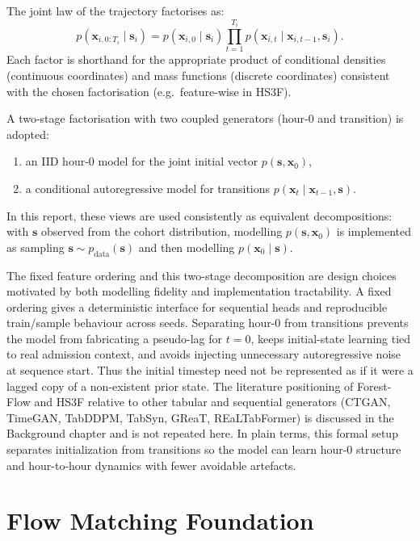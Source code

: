 The joint law of the trajectory factorises as:
\begin{equation}
p(\mathbf{x}_{i,0:T_i} \mid \mathbf{s}_i)
= p(\mathbf{x}_{i,0} \mid \mathbf{s}_i)\prod_{t=1}^{T_i}p(\mathbf{x}_{i,t}\mid \mathbf{x}_{i,t-1}, \mathbf{s}_i).
\end{equation}
Each factor is shorthand for the appropriate product of conditional densities (continuous coordinates) and mass functions (discrete coordinates) consistent with the chosen factorisation (e.g.\ feature-wise in HS3F).

A two-stage factorisation with two coupled generators (hour-0 and transition) is adopted:
\begin{enumerate}\tightlist
    \item an IID hour-0 model for the joint initial vector $p(\mathbf{s},\mathbf{x}_{0})$,
    \item a conditional autoregressive model for transitions $p(\mathbf{x}_{t}\mid\mathbf{x}_{t-1},\mathbf{s})$.
\end{enumerate}
In this report, these views are used consistently as equivalent decompositions: with $\mathbf{s}$ observed from the cohort distribution, modelling $p(\mathbf{s},\mathbf{x}_0)$ is implemented as sampling $\mathbf{s}\sim p_{\text{data}}(\mathbf{s})$ and then modelling $p(\mathbf{x}_0\mid\mathbf{s})$.

The fixed feature ordering and this two-stage decomposition are design choices motivated by both modelling fidelity and implementation tractability. A fixed ordering gives a deterministic interface for sequential heads and reproducible train/sample behaviour across seeds. Separating hour-0 from transitions prevents the model from fabricating a pseudo-lag for $t=0$, keeps initial-state learning tied to real admission context, and avoids injecting unnecessary autoregressive noise at sequence start.
Thus the initial timestep need not be represented as if it were a lagged copy of a non-existent prior state.
The literature positioning of Forest-Flow and HS3F relative to other tabular and sequential generators (CTGAN, TimeGAN, TabDDPM, TabSyn, GReaT, REaLTabFormer) is discussed in the Background chapter and is not repeated here.
In plain terms, this formal setup separates initialization from transitions so the model can learn hour-0 structure and hour-to-hour dynamics with fewer avoidable artefacts.

\section{Flow Matching Foundation}

